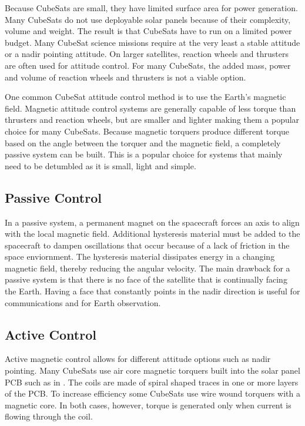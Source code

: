 Because CubeSats are small, they have limited surface area for power generation. Many CubeSats do not use deployable solar panels because of their complexity, volume and weight. The result is that CubeSats have to run on a limited power budget. Many CubeSat science missions require at the very least a stable attitude or a nadir pointing attitude. On larger satellites, reaction wheels and thrusters are often used for attitude control. For many CubeSats, the added mass, power and volume of reaction wheels and thrusters is not a viable option.

One common CubeSat attitude control method is to use the Earth's magnetic field. Magnetic attitude control systems are generally capable of less torque than thrusters and reaction wheels, but are smaller and lighter making them a popular choice for many CubeSats. Because magnetic torquers produce different torque based on the angle between the torquer and the magnetic field, a completely passive system can be built. This is a popular choice for systems that mainly need to be detumbled as it is small, light and simple. 

\subsection{Passive Control}

In a passive system, a permanent magnet on the spacecraft forces an axis to align with the local magnetic field. Additional hysteresis material must be added to the spacecraft to dampen oscillations that occur because of a lack of friction in the space enviornment. The hysteresis material dissipates energy in a changing magnetic field, thereby reducing the angular velocity. The main drawback for a passive system is that there is no face of the satellite that is continually facing the Earth. Having a face that constantly points in the nadir direction is useful for communications and for Earth observation.

\subsection{Active Control}

Active magnetic control allows for different attitude options such as nadir pointing. Many CubeSats use air core magnetic torquers built into the solar panel \ac{PCB} such as in \cite{6511478,ClydePannel}. The coils are made of spiral shaped traces in one or more layers of the \ac{PCB}. To increase efficiency some CubeSats use wire wound torquers with a magnetic core. In both cases, however, torque is generated only when current is flowing through the coil. 

